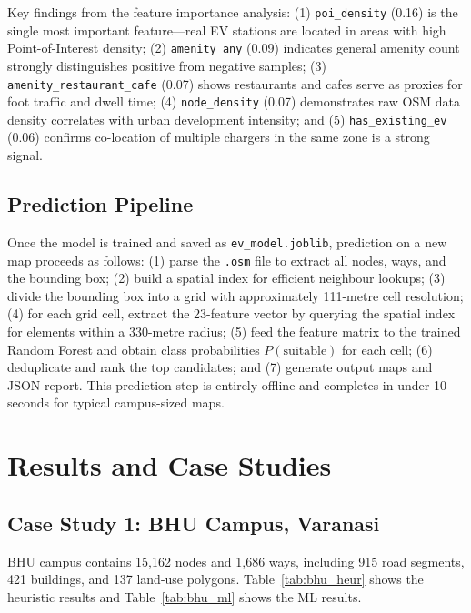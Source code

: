 \documentclass[conference]{IEEEtran}
\begin{document}
Key findings from the feature importance analysis: (1) \texttt{poi\_density} (0.16) is the single most important feature---real EV stations are located in areas with high Point-of-Interest density; (2) \texttt{amenity\_any} (0.09) indicates general amenity count strongly distinguishes positive from negative samples; (3) \texttt{amenity\_restaurant\_cafe} (0.07) shows restaurants and cafes serve as proxies for foot traffic and dwell time; (4) \texttt{node\_density} (0.07) demonstrates raw OSM data density correlates with urban development intensity; and (5) \texttt{has\_existing\_ev} (0.06) confirms co-location of multiple chargers in the same zone is a strong signal.

\subsection{Prediction Pipeline}

Once the model is trained and saved as \texttt{ev\_model.joblib}, prediction on a new map proceeds as follows: (1) parse the \texttt{.osm} file to extract all nodes, ways, and the bounding box; (2) build a spatial index for efficient neighbour lookups; (3) divide the bounding box into a grid with approximately 111-metre cell resolution; (4) for each grid cell, extract the 23-feature vector by querying the spatial index for elements within a 330-metre radius; (5) feed the feature matrix to the trained Random Forest and obtain class probabilities $P(\text{suitable})$ for each cell; (6) deduplicate and rank the top candidates; and (7) generate output maps and JSON report. This prediction step is entirely offline and completes in under 10 seconds for typical campus-sized maps.


\section{Results and Case Studies}

\subsection{Case Study 1: BHU Campus, Varanasi}

BHU campus contains 15,162 nodes and 1,686 ways, including 915 road segments, 421 buildings, and 137 land-use polygons. Table~\ref{tab:bhu_heur} shows the heuristic results and Table~\ref{tab:bhu_ml} shows the ML results.
\end{document}
